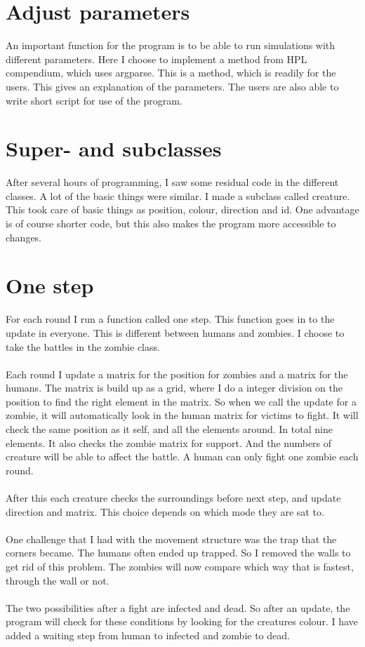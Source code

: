 \documentclass[11pt]{article}
\begin{document}
\section*{Adjust parameters}
An important function for the program is to be able to run simulations with different parameters. Here I choose to implement a method from HPL compendium, which uses argparse. This is a method, which is readily for the users. This gives an explanation of the parameters. The users are also able to write short script for use of the program. 

\section*{Super- and subclasses}
After several hours of programming, I saw some residual code in the different classes. A lot of the basic things were similar. I made a subclass called creature. This took care of basic things as position, colour, direction and id. One advantage is of course shorter code, but this also makes the program more accessible to changes.

\section*{One step}
For each round I run a function called one step. This function goes in to the update in everyone. This is different between humans and zombies. I choose to take the battles in the zombie class. 
\\
\\
Each round I update a matrix for the position for zombies and a matrix for the humans. The matrix is build up as a grid, where I do a integer division on the position to find the right element in the matrix. So when we call the update for a zombie, it will automatically look in the human matrix for victims to fight. It will check the same position as it self, and all the elements around. In total nine elements. It also checks the zombie matrix for support. And the numbers of creature will be able to affect the battle. A human can only fight one zombie each round. 
\\
\\
After this each creature checks the surroundings before next step, and update direction and matrix. This choice depends on which mode they are sat to. 
\\
\\
One challenge that I had with the movement structure was the trap that the corners became. The humans often ended up trapped. So I removed the walls to get rid of this problem. The zombies will now compare which way that is fastest, through the wall or not. 
\\
\\
The two possibilities after a fight are infected and dead. So after an update, the program will check for these conditions by looking for the creatures colour.  I have added a waiting step from human to infected and zombie to dead.
\end{document}
